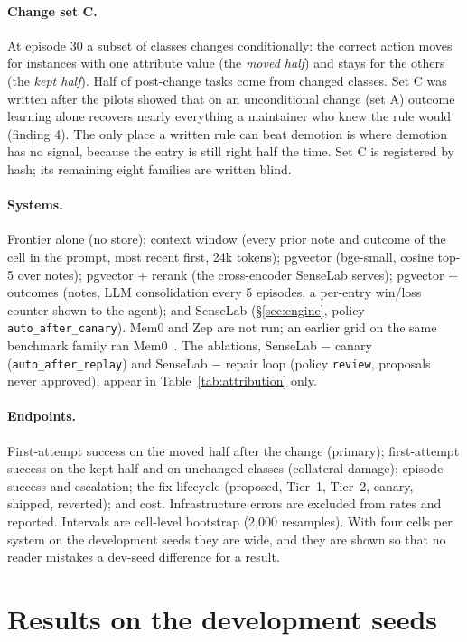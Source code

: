\documentclass[11pt]{article}
\newcommand{\code}[1]{\texttt{#1}}
\begin{document}
\paragraph{Change set C.} At episode 30 a subset of classes changes conditionally: the correct
action moves for instances with one attribute value (the \emph{moved half}) and stays for the
others (the \emph{kept half}). Half of post-change tasks come from changed classes. Set C was
written after the pilots showed that on an unconditional change (set A) outcome learning alone
recovers nearly everything a maintainer who knew the rule would (finding 4). The only place a
written rule can beat demotion is where demotion has no signal, because the entry is still right
half the time. Set C is registered by hash; its remaining eight families are written blind.

\paragraph{Systems.} Frontier alone (no store); context window (every prior note and outcome of
the cell in the prompt, most recent first, 24k tokens); pgvector (bge-small, cosine top-5 over
notes); pgvector + rerank (the cross-encoder SenseLab serves); pgvector + outcomes (notes, LLM
consolidation every 5 episodes, a per-entry win/loss counter shown to the agent); and SenseLab
(\S\ref{sec:engine}, policy \code{auto\_after\_canary}). Mem0 and Zep are not run; an earlier
grid on the same benchmark family ran Mem0~\cite{senselab-cl}. The ablations, SenseLab $-$ canary
(\code{auto\_after\_replay}) and SenseLab $-$ repair loop (policy \code{review}, proposals never
approved), appear in Table~\ref{tab:attribution} only.

\paragraph{Endpoints.} First-attempt success on the moved half after the change (primary);
first-attempt success on the kept half and on unchanged classes (collateral damage); episode
success and escalation; the fix lifecycle (proposed, Tier~1, Tier~2, canary, shipped, reverted);
and cost. Infrastructure errors are excluded from rates and reported. Intervals are cell-level
bootstrap (2,000 resamples). With four cells per system on the development seeds they are wide,
and they are shown so that no reader mistakes a dev-seed difference for a result.

\section{Results on the development seeds}
\label{sec:results}
\end{document}
